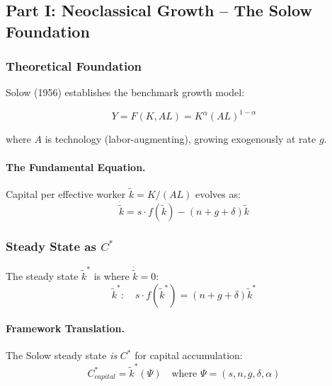 \subsection{Part I: Neoclassical Growth – The Solow Foundation}

\subsubsection{Theoretical Foundation}

Solow (1956) establishes the benchmark growth model:

\begin{equation}
\boxed{
Y = F(K, AL) = K^\alpha (AL)^{1-\alpha}
}
\label{eq:solow-production}
\end{equation}

where $A$ is technology (labor-augmenting), growing exogenously at rate $g$.

\paragraph{The Fundamental Equation.}
Capital per effective worker $\tilde{k} = K/(AL)$ evolves as:
\begin{equation}
\dot{\tilde{k}} = s \cdot f(\tilde{k}) - (n + g + \delta) \tilde{k}
\end{equation}

\subsubsection{Steady State as $C^*$}

The steady state $\tilde{k}^*$ is where $\dot{\tilde{k}} = 0$:
\begin{equation}
\boxed{
\tilde{k}^* : \quad s \cdot f(\tilde{k}^*) = (n + g + \delta) \tilde{k}^*
}
\label{eq:solow-steady}
\end{equation}

\paragraph{Framework Translation.}
The Solow steady state \textit{is} $C^*$ for capital accumulation:
\begin{equation}
C^*_{capital} = \tilde{k}^*(\Psi) \quad \text{where } \Psi = (s, n, g, \delta, \alpha)
\end{equation}

